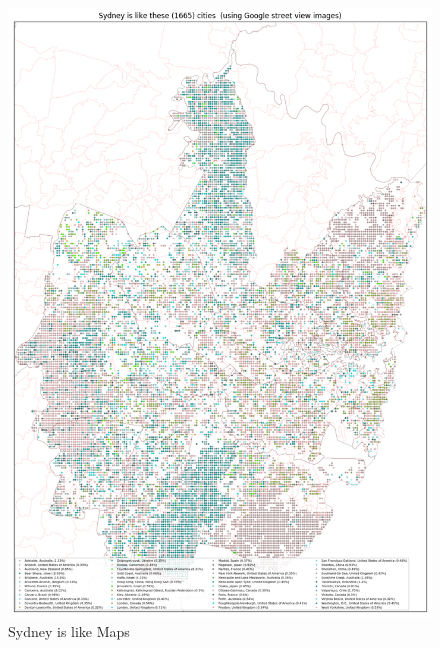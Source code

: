 \documentclass[sageh,times]{sagej}
\begin{document}
\begin{figure}[!htbp]
\includegraphics[scale=0.20]{Images/SydneyOverallAbrev_maps.png}  
\caption{Sydney is like Maps}    
 \label{fig:sydmaps}  
\end{figure} 
\end{document}
